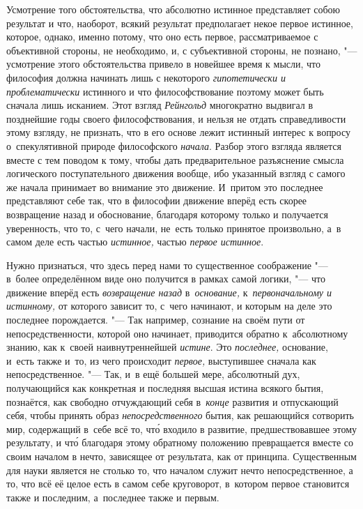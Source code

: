 Усмотрение того обстоятельства, что абсолютно истинное представляет собою
результат и что, наоборот, всякий результат предполагает некое первое истинное,
которое, однако, именно потому, что оно есть первое, рассматриваемое с
объективной стороны, не необходимо, и, с субъективной стороны, не познано, "---
усмотрение этого обстоятельства привело в новейшее время к мысли, что философия
должна начинать лишь с некоторого {\em гипотетически и проблематически}
истинного и что философствование поэтому может быть сначала лишь исканием. Этот
взгляд {\em Рейнгольд} многократно выдвигал в позднейшие годы своего
философствования, и нельзя не отдать справедливости этому взгляду, не признать,
что в его основе лежит истинный интерес к вопросу о~спекулятивной природе
философского {\em начала}. Разбор этого взгляда является вместе с тем поводом к
тому, чтобы дать предварительное разъяснение смысла логического поступательного
движения вообще, ибо указанный взгляд с самого же начала принимает во внимание
это движение. И~притом это последнее представляют себе так, что в философии
движение вперёд есть скорее возвращение назад и обоснование, благодаря которому
только и получается уверенность, что то, с~чего начали, не~есть только принятое
произвольно, а~в самом деле есть частью {\em истинное,} частью
{\em первое истинное}.

Нужно признаться, что здесь перед нами то существенное соображение "--- в~более
определённом виде оно получится в рамках самой логики, "--- что движение вперёд
есть {\em возвращение назад} в~{\em основание,} к~{\em первоначальному и
истинному,} от которого зависит то, с~чего начинают, и которым на деле это
последнее порождается. "--- Так например, сознание на своём пути от
непосредственности, которой оно начинает, приводится обратно к~абсолютному
знанию, как к~своей наивнутреннейшей {\em истине}. Это {\em последнее,}
основание, и~есть также и~то, из чего происходит {\em первое,} выступившее
сначала как непосредственное. "--- Так, и~в ещё большей мере, абсолютный дух,
получающийся как конкретная и последняя высшая истина всякого бытия, познаётся,
как свободно отчуждающий себя в~{\em конце} развития и отпускающий себя, чтобы
принять образ {\em непосредственного} бытия, как решающийся сотворить мир,
содержащий в~себе всё то, чт\'{о} входило в развитие, предшествовавшее этому
результату, и чт\'{о} благодаря этому обратному положению превращается вместе
со своим началом в нечто, зависящее от результата, как от принципа.
Существенным для науки является не столько то, что началом служит нечто
непосредственное, а то, что всё её целое есть в самом себе круговорот,
в~котором первое становится также и последним, а~последнее также и первым.

